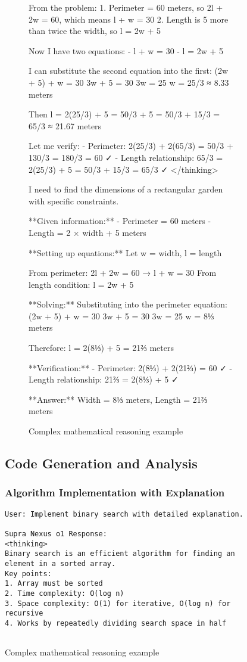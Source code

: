 \begin{table}[H]
\begin{figure}[H]
\begin{figure}[H]
\begin{minipage}{\textwidth}
From the problem:
1. Perimeter = 60 meters, so 2l + 2w = 60, which means l + w = 30
2. Length is 5 more than twice the width, so l = 2w + 5

Now I have two equations:
- l + w = 30
- l = 2w + 5

I can substitute the second equation into the first:
(2w + 5) + w = 30
3w + 5 = 30
3w = 25
w = 25/3 ≈ 8.33 meters

Then l = 2(25/3) + 5 = 50/3 + 5 = 50/3 + 15/3 = 65/3 ≈ 21.67 meters

Let me verify:
- Perimeter: 2(25/3) + 2(65/3) = 50/3 + 130/3 = 180/3 = 60 ✓
- Length relationship: 65/3 = 2(25/3) + 5 = 50/3 + 15/3 = 65/3 ✓
</thinking>

I need to find the dimensions of a rectangular garden with specific constraints.

**Given information:**
- Perimeter = 60 meters  
- Length = 2 × width + 5 meters

**Setting up equations:**
Let w = width, l = length

From perimeter: 2l + 2w = 60 → l + w = 30
From length condition: l = 2w + 5

**Solving:**
Substituting into the perimeter equation:
(2w + 5) + w = 30
3w + 5 = 30
3w = 25
w = 8⅓ meters

Therefore: l = 2(8⅓) + 5 = 21⅔ meters

**Verification:**
- Perimeter: 2(8⅓) + 2(21⅔) = 60 ✓
- Length relationship: 21⅔ = 2(8⅓) + 5 ✓

**Answer:** Width = 8⅓ meters, Length = 21⅔ meters
\end{minipage}
\caption{Complex mathematical reasoning example}
\label{fig:math-example}
\end{figure}

\subsection{Code Generation and Analysis}

\subsubsection{Algorithm Implementation with Explanation}

\begin{lstlisting}[caption=Binary search implementation with reasoning,label=lst:binary-search-example]
User: Implement binary search with detailed explanation.

Supra Nexus o1 Response:
<thinking>
Binary search is an efficient algorithm for finding an element in a sorted array.
Key points:
1. Array must be sorted
2. Time complexity: O(log n)
3. Space complexity: O(1) for iterative, O(log n) for recursive
4. Works by repeatedly dividing search space in half


\end{lstlisting}
\end{figure}
\end{table}
